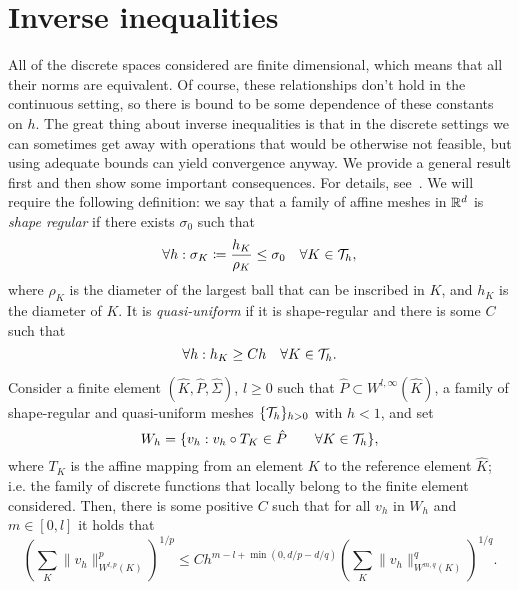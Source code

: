 \section{Inverse inequalities}\label{thm:inverse-inequalities}
All of the discrete spaces considered are finite dimensional, which means that all their norms are equivalent. Of course, these relationships don't hold in the continuous setting, so there is bound to be some dependence of these constants on $h$. The great thing about inverse inequalities is that in the discrete settings we can sometimes get away with operations that would be otherwise not feasible, but using adequate bounds can yield convergence anyway. We provide a general result first and then show some important consequences. For details, see~\cite{ern2004theory}. We will require the following definition: we say that a family of affine meshes in $\mathbb{R}^d$ is \emph{shape regular} if there exists $\sigma_0$ such that 
\begin{equation}
    \forall h: \sigma_K\coloneqq \frac{h_K}{\rho_K} \leq \sigma_0 \quad\forall K\in \mathcal{T}_h,
\end{equation}
where $\rho_K$ is the diameter of the largest ball that can be inscribed in $K$, and $h_K$ is the diameter of $K$. It is \emph{quasi-uniform} if it is shape-regular and there is some $C$ such that
\begin{equation}\label{eq:def-quasi-uniform}
    \forall h: h_K \geq C h \quad \forall K\in \mathcal{T}_h.
\end{equation}
\begin{theorem}\label{thm:global-inverse-inequality}
    Consider a finite element $(\hat K, \hat P, \hat \Sigma)$, $l\geq 0$ such that $\hat P\subset W^{l,\infty}(\hat K)$, a family of shape-regular and quasi-uniform meshes $\{\mathcal{T}_h\}_{h>0}$ with $h<1$, and set
    \begin{equation}
        W_h = \{v_h: v_h\circ T_K \in \hat P \qquad\forall K\in \mathcal{T}_h \},
    \end{equation}
    where $T_K$ is the affine mapping from an element $K$ to the reference element $\hat K$; i.e. the family of discrete functions that locally belong to the finite element considered. Then, there is some positive $C$ such that for all $v_h$ in $W_h$ and $m\in [0,l]$ it holds that
    \begin{equation}
        \left(\sum_K \| v_h\|^p_{W^{l,p}(K)}\right)^{1/p} \leq Ch^{m-l+\min(0, d/p - d/q)} \left(\sum_K \|v_h\|_{W^{m,q}(K)}^q\right)^{1/q}.
    \end{equation}
\end{theorem}

